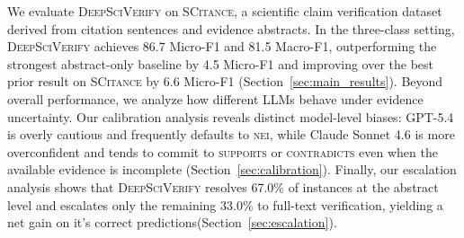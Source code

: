 \documentclass{article}
\theoremstyle{plain}
\theoremstyle{definition}
\theoremstyle{remark}
\begin{document}
We evaluate \textsc{DeepSciVerify} on \textsc{SCitance}\cite{alvarez2024zero}, a scientific claim verification dataset derived from citation sentences and evidence abstracts. In the three-class setting, \textsc{DeepSciVerify} achieves 86.7 Micro-F1 and 81.5 Macro-F1, outperforming the strongest abstract-only baseline by 4.5 Micro-F1 and improving over the best prior result on \textsc{SCitance} by 6.6 Micro-F1 (Section~\ref{sec:main_results}). Beyond overall performance, we analyze how different LLMs behave under evidence uncertainty. Our calibration analysis reveals distinct model-level biases: GPT-5.4 is overly cautious and frequently defaults to \textsc{nei}, while Claude Sonnet 4.6 is more overconfident and tends to commit to \textsc{supports} or \textsc{contradicts} even when the available evidence is incomplete (Section~\ref{sec:calibration}). Finally, our escalation analysis shows that \textsc{DeepSciVerify} resolves 67.0\% of instances at the abstract level and escalates only the remaining 33.0\% to full-text verification, yielding a net gain on it's correct predictions(Section~\ref{sec:escalation}).



\end{document}
